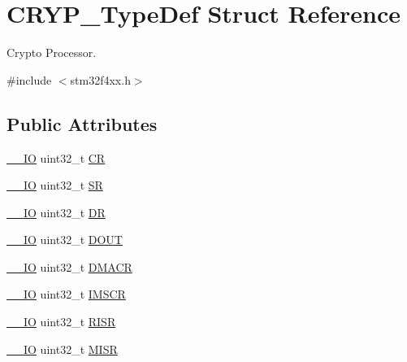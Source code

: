 \hypertarget{struct_c_r_y_p___type_def}{}\section{C\+R\+Y\+P\+\_\+\+Type\+Def Struct Reference}
\label{struct_c_r_y_p___type_def}


Crypto Processor.  




{\ttfamily \#include $<$stm32f4xx.\+h$>$}

\subsection*{Public Attributes}
\begin{DoxyCompactItemize}
\item 
\hyperlink{core__cm4_8h_aec43007d9998a0a0e01faede4133d6be}{\+\_\+\+\_\+\+IO} uint32\+\_\+t \hyperlink{struct_c_r_y_p___type_def_a65da2a40a06c5c391cbe346dbaa5380c}{CR}
\item 
\hyperlink{core__cm4_8h_aec43007d9998a0a0e01faede4133d6be}{\+\_\+\+\_\+\+IO} uint32\+\_\+t \hyperlink{struct_c_r_y_p___type_def_a1d5cabaf9aea97e1b6f08352bc249094}{SR}
\item 
\hyperlink{core__cm4_8h_aec43007d9998a0a0e01faede4133d6be}{\+\_\+\+\_\+\+IO} uint32\+\_\+t \hyperlink{struct_c_r_y_p___type_def_ab478a4717a3fa209b9c060ecaf70c9a1}{DR}
\item 
\hyperlink{core__cm4_8h_aec43007d9998a0a0e01faede4133d6be}{\+\_\+\+\_\+\+IO} uint32\+\_\+t \hyperlink{struct_c_r_y_p___type_def_a0b3e1f1551d11a01f7b2356e91281e7d}{D\+O\+UT}
\item 
\hyperlink{core__cm4_8h_aec43007d9998a0a0e01faede4133d6be}{\+\_\+\+\_\+\+IO} uint32\+\_\+t \hyperlink{struct_c_r_y_p___type_def_ad525241894427fc83a16e3370bb5b1d8}{D\+M\+A\+CR}
\item 
\hyperlink{core__cm4_8h_aec43007d9998a0a0e01faede4133d6be}{\+\_\+\+\_\+\+IO} uint32\+\_\+t \hyperlink{struct_c_r_y_p___type_def_a3ee13f960f6631c574b1018c97f95925}{I\+M\+S\+CR}
\item 
\hyperlink{core__cm4_8h_aec43007d9998a0a0e01faede4133d6be}{\+\_\+\+\_\+\+IO} uint32\+\_\+t \hyperlink{struct_c_r_y_p___type_def_a04be1b2f14a37aed1deff4d57e6261dd}{R\+I\+SR}
\item 
\hyperlink{core__cm4_8h_aec43007d9998a0a0e01faede4133d6be}{\+\_\+\+\_\+\+IO} uint32\+\_\+t \hyperlink{struct_c_r_y_p___type_def_aa807ff93c7ce98e9d13cbc52d245770f}{M\+I\+SR}
\item 

\end{DoxyCompactItemize}

